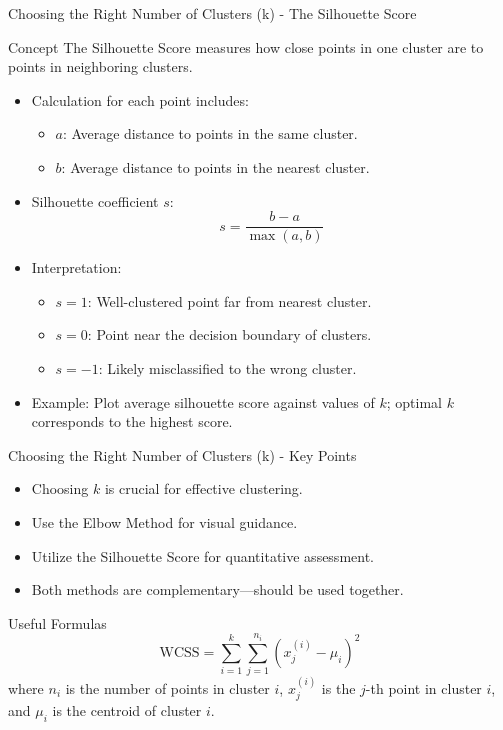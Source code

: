 \documentclass[aspectratio=169]{beamer}
\begin{document}
\begin{frame}[fragile]{Choosing the Right Number of Clusters (k) - The Silhouette Score}
    \begin{block}{Concept}
        The Silhouette Score measures how close points in one cluster are to points in neighboring clusters.
    \end{block}

    \begin{itemize}
        \item Calculation for each point includes:
        \begin{itemize}
            \item \(a\): Average distance to points in the same cluster.
            \item \(b\): Average distance to points in the nearest cluster.
        \end{itemize}
        \item Silhouette coefficient \(s\):
        \begin{equation}
            s = \frac{b - a}{\max(a, b)}
        \end{equation}
        \item Interpretation:
        \begin{itemize}
            \item \(s = 1\): Well-clustered point far from nearest cluster.
            \item \(s = 0\): Point near the decision boundary of clusters.
            \item \(s = -1\): Likely misclassified to the wrong cluster.
        \end{itemize}
        \item Example: Plot average silhouette score against values of \(k\); optimal \(k\) corresponds to the highest score.
    \end{itemize}
\end{frame}

\begin{frame}[fragile]{Choosing the Right Number of Clusters (k) - Key Points}
    \begin{itemize}
        \item Choosing \(k\) is crucial for effective clustering.
        \item Use the Elbow Method for visual guidance.
        \item Utilize the Silhouette Score for quantitative assessment.
        \item Both methods are complementary—should be used together.
    \end{itemize}

    \begin{block}{Useful Formulas}
        \begin{equation}
            \text{WCSS} = \sum_{i=1}^{k}\sum_{j=1}^{n_i} (x_j^{(i)} - \mu_i)^2
        \end{equation}
        where \(n_i\) is the number of points in cluster \(i\), \(x_j^{(i)}\) is the \(j\)-th point in cluster \(i\), and \(\mu_i\) is the centroid of cluster \(i\).
    \end{block}
\end{frame}
\end{document}
